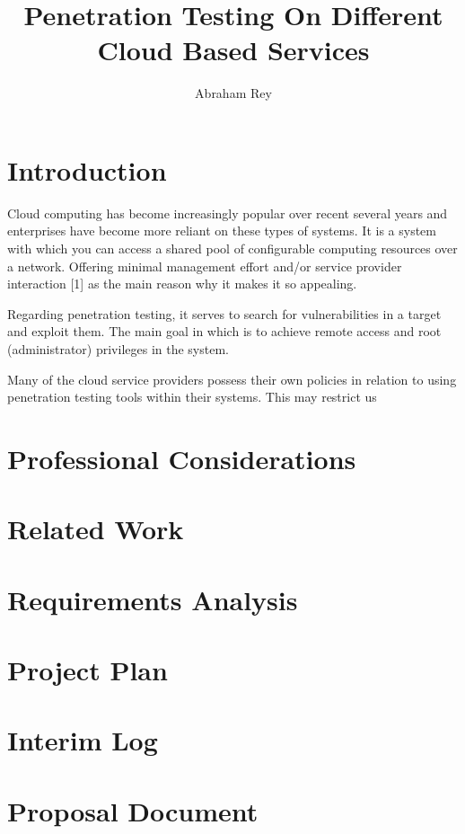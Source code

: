 \documentclass{report}
\title{Penetration Testing On Different Cloud Based Services}
\author{Abraham Rey}
\begin{document}
\maketitle

\section{Introduction}
Cloud computing has become increasingly popular over recent several years and enterprises have become more reliant on these types of systems. It is a system with which you can access a shared pool of configurable computing resources over a network. Offering minimal management effort and/or service provider interaction [1] as the main reason why it makes it so appealing. 

Regarding penetration testing, it serves to search for vulnerabilities in a target and exploit them. The main goal in which is to achieve remote access and root (administrator) privileges in the system.

Many of the cloud service providers possess their own policies in relation to using penetration testing tools within their systems. This may restrict us


\section{Professional Considerations}
\section{Related Work}
\section{Requirements Analysis}
\section{Project Plan}
\section{Interim Log}
\section{Proposal Document}
\end{document}
